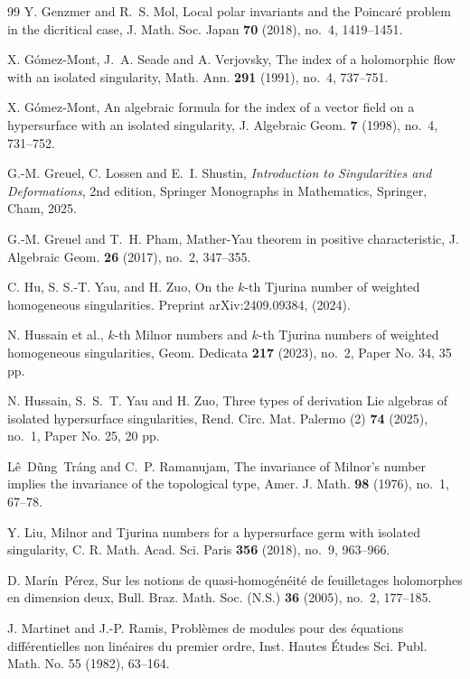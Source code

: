 \documentclass[12pt,letterpaper]{amsart}
\begin{document}
\begin{thebibliography}{99}
Y. Genzmer and R.~S. Mol, Local polar invariants and the Poincar\'e{} problem in the dicritical case, J. Math. Soc. Japan {\bf 70} (2018), no.~4, 1419--1451.

X. G\'omez-Mont, J.~A. Seade and A. Verjovsky, The index of a holomorphic flow with an isolated singularity, Math. Ann. {\bf 291} (1991), no.~4, 737--751.

X. G\'omez-Mont, An algebraic formula for the index of a vector field on a hypersurface with an isolated singularity, J. Algebraic Geom. {\bf 7} (1998), no.~4, 731--752.

G.-M. Greuel, C. Lossen and E.~I. Shustin, {\it Introduction to Singularities and Deformations}, 2nd edition, 
Springer Monographs in Mathematics, Springer, Cham, 2025.


G.-M. Greuel and T.~H. Pham, Mather-Yau theorem in positive characteristic, J. Algebraic Geom. {\bf 26} (2017), no.~2, 347--355.


C. Hu, S. S.-T. Yau, and H. Zuo, On the $k$-th Tjurina number of weighted homogeneous singularities. Preprint arXiv:2409.09384, (2024).

N. Hussain et al., $k$-th Milnor numbers and $k$-th Tjurina numbers of weighted homogeneous singularities, Geom. Dedicata {\bf 217} (2023), no.~2, Paper No. 34, 35 pp.

N. Hussain, S.~S.~T. Yau and H. Zuo, Three types of derivation Lie algebras of isolated hypersurface singularities, Rend. Circ. Mat. Palermo (2) {\bf 74} (2025), no.~1, Paper No. 25, 20 pp.

L\^e~D\~ung~Tr\'ang and C.~P. Ramanujam, The invariance of Milnor's number implies the invariance of the topological type, Amer. J. Math. {\bf 98} (1976), no.~1, 67--78.


Y. Liu, Milnor and Tjurina numbers for a hypersurface germ with isolated singularity, C. R. Math. Acad. Sci. Paris {\bf 356} (2018), no.~9, 963--966.



D. Mar\'in~P\'erez, Sur les notions de quasi-homog\'en\'eit\'e{} de feuilletages holomorphes en dimension deux, Bull. Braz. Math. Soc. (N.S.) {\bf 36} (2005), no.~2, 177--185. 



J. Martinet and J.-P. Ramis, Probl\`emes de modules pour des \'equations diff\'erentielles non lin\'eaires du premier ordre, Inst. Hautes \'Etudes Sci. Publ. Math. No. 55 (1982), 63--164.


\end{thebibliography}
\end{document}
